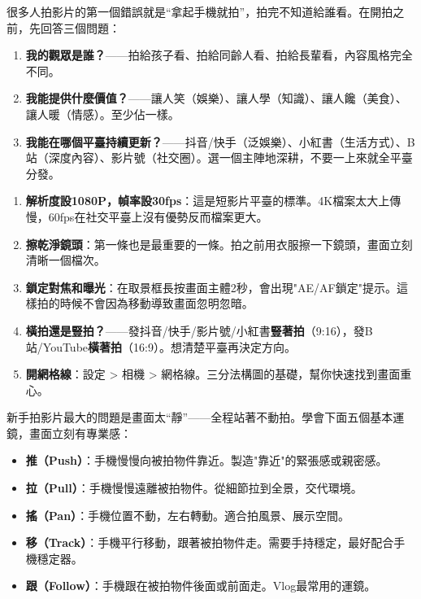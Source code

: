


很多人拍影片的第一個錯誤就是“拿起手機就拍”，拍完不知道給誰看。在開拍之前，先回答三個問題：

\begin{enumerate}
  \item \textbf{我的觀眾是誰？}——拍給孩子看、拍給同齡人看、拍給長輩看，內容風格完全不同。
  \item \textbf{我能提供什麼價值？}——讓人笑（娛樂）、讓人學（知識）、讓人饞（美食）、讓人暖（情感）。至少佔一樣。
  \item \textbf{我能在哪個平臺持續更新？}——抖音/快手（泛娛樂）、小紅書（生活方式）、B站（深度內容）、影片號（社交圈）。選一個主陣地深耕，不要一上來就全平臺分發。
\end{enumerate}


\begin{enumerate}
  \item \textbf{解析度設1080P，幀率設30fps}：這是短影片平臺的標準。4K檔案太大上傳慢，60fps在社交平臺上沒有優勢反而檔案更大。
  \item \textbf{擦乾淨鏡頭}：第一條也是最重要的一條。拍之前用衣服擦一下鏡頭，畫面立刻清晰一個檔次。
  \item \textbf{鎖定對焦和曝光}：在取景框長按畫面主體2秒，會出現"AE/AF鎖定"提示。這樣拍的時候不會因為移動導致畫面忽明忽暗。
  \item \textbf{橫拍還是豎拍？}——發抖音/快手/影片號/小紅書\textbf{豎著拍}（9:16），發B站/YouTube\textbf{橫著拍}（16:9）。想清楚平臺再決定方向。
  \item \textbf{開網格線}：設定 > 相機 > 網格線。三分法構圖的基礎，幫你快速找到畫面重心。
\end{enumerate}


新手拍影片最大的問題是畫面太“靜”——全程站著不動拍。學會下面五個基本運鏡，畫面立刻有專業感：

\begin{itemize}
  \item \textbf{推（Push）}：手機慢慢向被拍物件靠近。製造"靠近"的緊張感或親密感。
  \item \textbf{拉（Pull）}：手機慢慢遠離被拍物件。從細節拉到全景，交代環境。
  \item \textbf{搖（Pan）}：手機位置不動，左右轉動。適合拍風景、展示空間。
  \item \textbf{移（Track）}：手機平行移動，跟著被拍物件走。需要手持穩定，最好配合手機穩定器。
  \item \textbf{跟（Follow）}：手機跟在被拍物件後面或前面走。Vlog最常用的運鏡。
\end{itemize}

